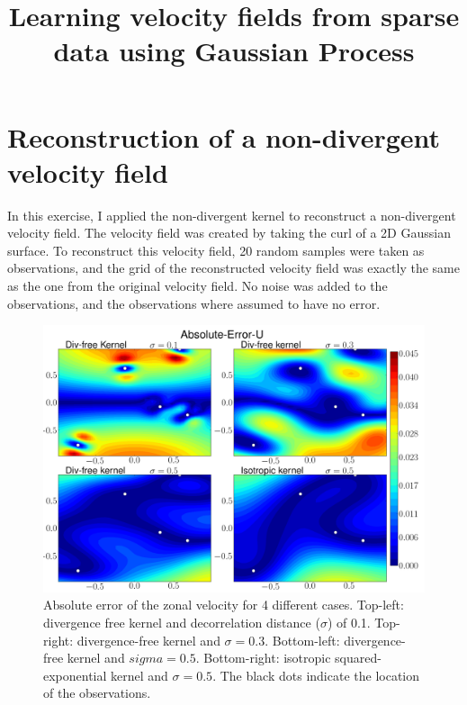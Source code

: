 \documentclass[12pt,a4paper]{article}%
\title{Learning velocity fields from sparse data using Gaussian Process}
\author{}
\begin{document}
\section{Reconstruction of a non-divergent velocity field}
In this exercise, I applied the non-divergent kernel to reconstruct 
a non-divergent velocity field. The velocity field was created by taking 
the curl of a 2D Gaussian surface. To reconstruct this velocity field, 
20 random samples were taken as observations, and the grid of the reconstructed 
velocity field was exactly the same as the one from the original velocity field. 
No noise was added to the observations, and the observations where assumed to 
have no error.

\newpage

\begin{figure}
\noindent\includegraphics[width=36pc]{plots/Absolute-Error-U-contour.png}
\caption{Absolute error of the zonal velocity for 4 different cases. Top-left: 
divergence free kernel and decorrelation distance ($\sigma$) of 0.1. 
Top-right: divergence-free kernel and $\sigma=0.3$. Bottom-left: 
divergence-free kernel and $sigma=0.5$. Bottom-right: isotropic 
squared-exponential kernel and $\sigma=0.5$. The black dots indicate the location 
of the observations.}
\label{contour_u}
\end{figure}
\end{document}
